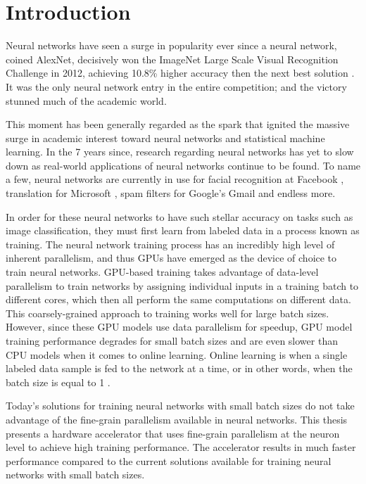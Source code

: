 \chapter{Introduction}
Neural networks have seen a surge in popularity ever since a neural network, coined AlexNet, decisively won the ImageNet Large Scale Visual Recognition Challenge in 2012, achieving 10.8\% higher accuracy then the next best solution \cite{Krizhevsky}. It was the only neural network entry in the entire competition; and the victory stunned much of the academic world.

This moment has been generally regarded as the spark that ignited the massive surge in academic interest toward neural networks and statistical machine learning. In the 7 years since, research regarding neural networks has yet to slow down as real-world applications of neural networks continue to be found. To name a few, neural networks are currently in use for facial recognition at Facebook \cite{deepface}, translation for Microsoft \cite{translation}, spam filters for Google's Gmail \cite{gmail} and endless more.

In order for these neural networks to have such stellar accuracy on tasks such as image classification, they must first learn from labeled data in a process known as training. The neural network training process has an incredibly high level of inherent parallelism, and thus GPUs have emerged as the device of choice to train neural networks. GPU-based training takes advantage of data-level parallelism to train networks by assigning individual inputs in a training batch to different cores, which then all perform the same computations on different data. This coarsely-grained approach to training works well for large batch sizes. However, since these GPU models use data parallelism for speedup, GPU model training performance degrades for small batch sizes and are even slower than CPU models when it comes to online learning. Online learning is when a single labeled data sample is fed to the network at a time, or in other words, when the batch size is equal to 1 \cite{batch-size}. 

Today's solutions for training neural networks with small batch sizes do not take advantage of the fine-grain parallelism available in neural networks. This thesis presents a hardware accelerator that uses fine-grain parallelism at the neuron level to achieve high training performance. The accelerator results in much faster performance compared to the current solutions available for training neural networks with small batch sizes.

